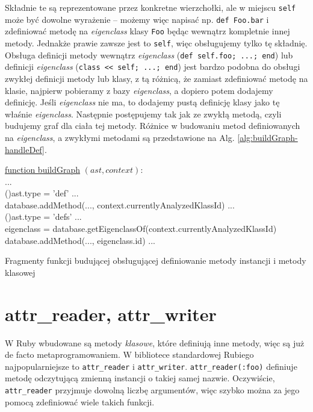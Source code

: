 \documentclass[declaration,shortabstract,mgr]{iithesis}
\newcommand{\algsize}{\small}
\begin{document}
Składnie te są reprezentowane przez konkretne wierzchołki, ale w miejscu \texttt{self} może być dowolne wyrażenie -- możemy więc napisać np. \texttt{def Foo.bar} i zdefiniować metodę na \textit{eigenclass} klasy \texttt{Foo} będąc wewnątrz kompletnie innej metody.
Jednakże prawie zawsze jest to \texttt{self}, więc obsługujemy tylko tę składnię.
Obsługa definicji metody wewnątrz \textit{eigenclass} (\texttt{def self.foo; ...; end}) lub definicji \textit{eigenclass} (\texttt{class << self; ...; end}) jest bardzo podobna do obsługi zwykłej definicji metody lub klasy, z tą różnicą, że zamiast zdefiniować metodę na klasie, najpierw pobieramy z bazy \textit{eigenclass}, a dopiero potem dodajemy definicję.
Jeśli \textit{eigenclass} nie ma, to dodajemy pustą definicję klasy jako tę właśnie \textit{eigenclass}. Następnie postępujemy tak jak ze zwykłą metodą, czyli budujemy graf dla ciała tej metody. Różnice w budowaniu metod definiowanych na \emph{eigenclass}, a zwykłymi metodami są przedstawione na Alg. \ref{alg:buildGraph-handleDef}.

\begin{algorithm}
    \algsize
    \underline{function buildGraph} $(ast, context)$:\\
    ...\\
    \If(){ast.type = 'def'}{
        ...\\
        database.addMethod(..., context.currentlyAnalyzedKlassId)\;
        ...\\
    }
    \If(){ast.type = 'defs'}{
        ...\\
        eigenclass = database.getEigenclassOf(context.currentlyAnalyzedKlassId)\;
        database.addMethod(..., eigenclass.id)\;
        ...\\
    }
    \caption{Fragmenty funkcji budującej obsługującej definiowanie metody instancji i metody klasowej}
    \label{alg:buildGraph-handleDef}
\end{algorithm}


\section{attr\_reader, attr\_writer}

W Ruby wbudowane są metody \textit{klasowe}, które definiują inne metody, więc są już de facto metaprogramowaniem.
W bibliotece standardowej Rubiego najpopularniejsze to \texttt{attr\_reader} i \texttt{attr\_writer}.
\texttt{attr\_reader(:foo)} definiuje metodę odczytującą zmienną instancji o takiej samej nazwie. Oczywiście, \texttt{attr\_reader} przyjmuje dowolną liczbę argumentów, więc szybko można za jego pomocą zdefiniować wiele takich funkcji.
\end{document}
